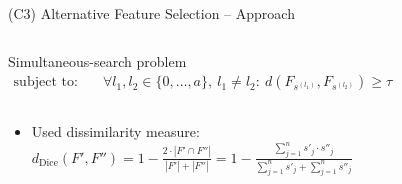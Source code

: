 \documentclass[en, navbarinline, handout]{sdqbeamer}
\begin{document}
\begin{frame}[t]{(C3) Alternative Feature Selection -- Approach}
\begin{columns}
\begin{greenblock}{Simultaneous-search problem}
\begin{equation*}
\begin{aligned}
					\text{subject to:} &\quad \forall l_1, l_2 \in \{0, \dots, a\},~l_1 \neq l_2:~d(F_{s^{(l_1)}},F_{s^{(l_2)}}) \geq \tau
				\end{aligned}
				\label{eq:afs:afs-simultaneous}
			\end{equation*}
		\end{greenblock}
	\end{columns}
	\pause
	\vspace{\baselineskip}
	\begin{itemize}
		\item Used dissimilarity measure: $d_{\text{Dice}}(F',F'') = 1 - \frac{2 \cdot |F' \cap F''|}{|F'| + |F''|} = 1 - \frac{\sum_{j=1}^n s'_j \cdot s''_j}{\sum_{j=1}^n s'_j + \sum_{j=1}^n s''_j}$
	\end{itemize}
\end{frame}
\end{document}
